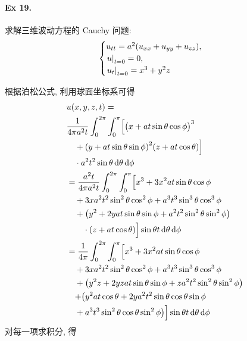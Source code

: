 \paragraph{Ex 19.}
求解三维波动方程的 Cauchy 问题:
\[ \begin{cases}
u_{tt} = a^2 (u_{xx} + u_{yy} + u_{zz}), \\
{\left.{u} \right|}_{t=0} = 0, \\
{\left.{u_t} \right|}_{t=0} = x^3 + y^2 z
\end{cases} \]

\begin{solution}
根据泊松公式, 利用球面坐标系可得
\begin{align*}
&u(x, y, z, t) = \\
&\frac{1}{4\pi a^2 t} \int_0^{2\pi} \int_0^\pi \Bigl[
    \bigl( x + at\sin\theta \cos\phi \bigr)^3 \\
    &\quad+ {\left( {y + at\sin\theta \sin\phi} \right)}^2 (z + at\cos\theta)
    \Bigr] \\
    &\quad\cdot a^2 t^2 \sin\theta \operatorname{d\!}\theta \operatorname{d\!}\phi\\
&=\frac{a^2 t}{4\pi a^2 t} \int_0^{2\pi} \int_0^\pi \Bigl[
    x^3 + 3x^2 at\sin\theta \cos\phi \\
    &\quad+ 3x a^2t^2\sin^2\theta \cos^2\phi + a^3t^3\sin^3\theta \cos^3\phi \\
    &\quad+\bigl( y^2 + 2yat\sin\theta \sin\phi + a^2t^2\sin^2\theta
	    \sin^2\phi \bigr) \\
    &\quad\quad\cdot (z + at\cos\theta) \Bigr]
	    \sin\theta t \operatorname{d\!}\theta \operatorname{d\!}\phi \\
&=\frac{1}{4\pi} \int_0^{2\pi} \int_0^\pi \Bigl[
    x^3 + 3x^2 at\sin\theta \cos\phi \\
    &\quad+ 3x a^2t^2\sin^2\theta \cos^2\phi
    +a^3t^3\sin^3\theta \cos^3\phi \\
    &\quad+{\left( {
        y^2z + 2yzat\sin\theta \sin\phi + za^2t^2\sin^2\theta \sin^2\phi
    } \right)} \\
    &\quad+\bigr(
        y^2at\cos\theta + 2ya^2t^2\sin\theta \cos\theta \sin\phi \\
    &\quad+ a^3t^3\sin^2\theta \cos\theta \sin^2\phi \bigr)
    \Bigr] \sin\theta t \operatorname{d\!}\theta \operatorname{d\!}\phi
\end{align*}
对每一项求积分, 得
\begin{align*}

\end{align*}
\end{solution}
